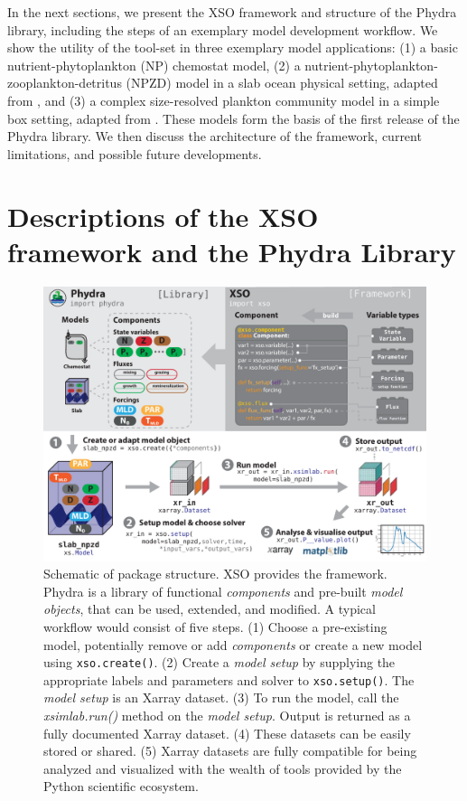 \documentclass[journal abbreviation, manuscript]{copernicus}
\begin{document}
In the next sections, we present the XSO framework and structure of the Phydra library, including the steps of an exemplary model development workflow. We show the utility of the tool-set in three exemplary model applications: (1) a basic nutrient-phytoplankton (NP) chemostat model, (2) a nutrient-phytoplankton-zooplankton-detritus (NPZD) model in a slab ocean physical setting, adapted from \citet{Anderson2015c}, and (3) a complex size-resolved plankton community model in a simple box setting, adapted from \citet{Banas2011b}. These models form the basis of the first release of the Phydra library. We then discuss the architecture of the framework, current limitations, and possible future developments.


\section{Descriptions of the XSO framework and the Phydra Library} \label{Section:phydrapackage}
%
\begin{figure}[t]
\includegraphics[width=12cm]{Figures/firstdraft_schematics/00_schematics_Package.pdf}
\caption{Schematic of package structure. XSO provides the framework. Phydra is a library of functional \textit{components} and pre-built \textit{model objects}, that can be used, extended, and modified. A typical workflow would consist of five steps. (1) Choose a pre-existing model, potentially remove or add \textit{components} or create a new model using \texttt{xso.create()}. (2) Create a \textit{model setup} by supplying the appropriate labels and parameters and solver to \texttt{xso.setup()}. The \textit{model setup} is an Xarray dataset. (3) To run the model, call the \textit{xsimlab.run()} method on the \textit{model setup}. Output is returned as a fully documented Xarray dataset. (4) These datasets can be easily stored or shared. (5) Xarray datasets are fully compatible for being analyzed and visualized with the wealth of tools provided by the Python scientific ecosystem.}
\label{Figure:PhydraXSOPackageSchematics}
\end{figure}
\end{document}
